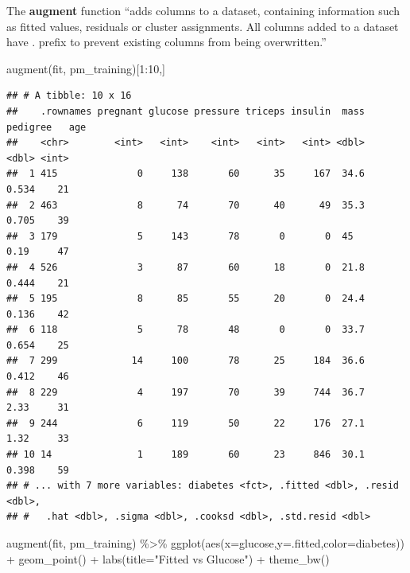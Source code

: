 \documentclass[
]{article}
\newenvironment{Shaded}{\begin{snugshade}}{\end{snugshade}}
\newcommand{\AttributeTok}[1]{\textcolor[rgb]{0.77,0.63,0.00}{#1}}
\newcommand{\DecValTok}[1]{\textcolor[rgb]{0.00,0.00,0.81}{#1}}
\newcommand{\FunctionTok}[1]{\textcolor[rgb]{0.00,0.00,0.00}{#1}}
\newcommand{\NormalTok}[1]{#1}
\newcommand{\SpecialCharTok}[1]{\textcolor[rgb]{0.00,0.00,0.00}{#1}}
\newcommand{\StringTok}[1]{\textcolor[rgb]{0.31,0.60,0.02}{#1}}
\begin{document}
The \textbf{augment} function ``adds columns to a dataset, containing
information such as fitted values, residuals or cluster assignments. All
columns added to a dataset have . prefix to prevent existing columns
from being overwritten.''

\begin{Shaded}
\begin{Highlighting}[]
\FunctionTok{augment}\NormalTok{(fit, pm\_training)[}\DecValTok{1}\SpecialCharTok{:}\DecValTok{10}\NormalTok{,]}
\end{Highlighting}
\end{Shaded}

\begin{verbatim}
## # A tibble: 10 x 16
##    .rownames pregnant glucose pressure triceps insulin  mass pedigree   age
##    <chr>        <int>   <int>    <int>   <int>   <int> <dbl>    <dbl> <int>
##  1 415              0     138       60      35     167  34.6    0.534    21
##  2 463              8      74       70      40      49  35.3    0.705    39
##  3 179              5     143       78       0       0  45      0.19     47
##  4 526              3      87       60      18       0  21.8    0.444    21
##  5 195              8      85       55      20       0  24.4    0.136    42
##  6 118              5      78       48       0       0  33.7    0.654    25
##  7 299             14     100       78      25     184  36.6    0.412    46
##  8 229              4     197       70      39     744  36.7    2.33     31
##  9 244              6     119       50      22     176  27.1    1.32     33
## 10 14               1     189       60      23     846  30.1    0.398    59
## # ... with 7 more variables: diabetes <fct>, .fitted <dbl>, .resid <dbl>,
## #   .hat <dbl>, .sigma <dbl>, .cooksd <dbl>, .std.resid <dbl>
\end{verbatim}

\begin{Shaded}
\begin{Highlighting}[]
\FunctionTok{augment}\NormalTok{(fit, pm\_training) }\SpecialCharTok{\%\textgreater{}\%} 
  \FunctionTok{ggplot}\NormalTok{(}\FunctionTok{aes}\NormalTok{(}\AttributeTok{x=}\NormalTok{glucose,}\AttributeTok{y=}\NormalTok{.fitted,}\AttributeTok{color=}\NormalTok{diabetes)) }\SpecialCharTok{+} 
  \FunctionTok{geom\_point}\NormalTok{() }\SpecialCharTok{+} \FunctionTok{labs}\NormalTok{(}\AttributeTok{title=}\StringTok{"Fitted vs Glucose"}\NormalTok{) }\SpecialCharTok{+} \FunctionTok{theme\_bw}\NormalTok{()}
\end{Highlighting}
\end{Shaded}
\end{document}
